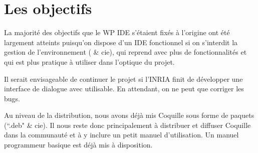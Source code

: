 \section{Les objectifs}

La majorité des objectifs que le WP IDE s'étaient fixés à l'origine ont été largement atteints puisqu'on dispose d'un IDE fonctionnel si on s'interdit la gestion de l'environnement ( \& cie),  qui reprend \coqide avec plus de fonctionnalités et qui est plus pratique à utiliser dans l'optique du projet.

Il serait envisageable de continuer le projet si l'INRIA finit de développer une interface de dialogue avec \coq utilisable.
En attendant, on ne peut que corriger les bugs.

Au niveau de la distribution, nous avons déjà mis Coquille sous forme de paquets (``.deb" \& cie). Il nous reste donc principalement à distribuer et diffuser Coquille dans la communauté \coq et à y inclure un petit manuel d'utilisation. Un manuel programmeur basique est déjà mis à disposition.

